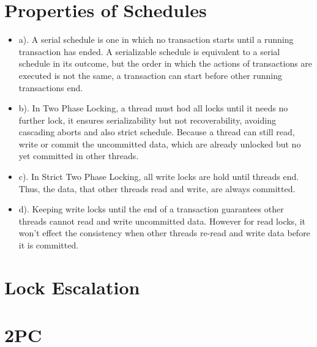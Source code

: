 \documentclass[a4paper, 14pt]{article}
\begin{document}
\section{Properties of Schedules}
\begin{itemize}
\item a). A serial schedule is one in which no transaction starts until a running transaction has ended. A serializable schedule is equivalent to a serial schedule in its outcome, but the order in which the actions of transactions are executed is not the same, a transaction can start before other running transactions end.
\item b). In Two Phase Locking, a thread must hod all locks until it needs no further lock, it ensures serializability but not recoverability, avoiding cascading aborts and also strict schedule. Because a thread can still read, write or commit the uncommitted data, which are already unlocked but no yet committed in other threads.
\item c). In Strict Two Phase Locking, all write locks are hold until threads end. Thus, the data, that other threads read and write, are always committed.
\item d). Keeping write locks until the end of a transaction guarantees other threads cannot read and write uncommitted data. However for read locks, it won't effect the consistency when other threads re-read and write data before it is committed.
\end{itemize}

\section{Lock Escalation}


\section{2PC}


%
\end{document}
